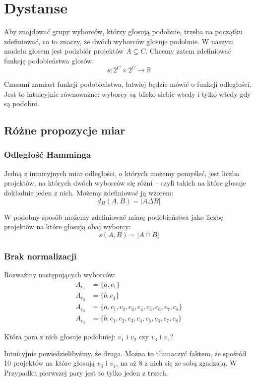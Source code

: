 \documentclass{article}
\begin{document}
\section{Dystanse}

Aby znajdować grupy wyborców, którzy głosują podobnie, trzeba na początku
zdefiniować, co to znaczy, że dwóch wyborców głosuje podobnie. W naszym modelu
głosem jest podzbiór projektów $A \subseteq C$. Chcemy zatem zdefiniować
funkcję podobieństwa głosów:
\[ s : 2^C \times 2^C \to \mathbb{R} \]

Czasami zamiast funkcji podobieństwa, łatwiej będzie mówić o funkcji
odległości. Jest to intuicyjnie równoważne: wyborcy są blisko siebie wtedy i
tylko wtedy gdy są podobni.

\subsection{Różne propozycje miar}

\subsubsection{Odległość Hamminga}

Jedną z intuicyjnych miar odległości, o których możemy pomyśleć, jest liczba
projektów, na których dwóch wyborców się różni -- czyli takich na które głosuje
dokładnie jeden z nich. Możemy zdefiniować ją wzorem:
\[ d_H(A,B) = |A \Delta B| \]

W podobny sposób możemy zdefiniować miarę podobieństwa jako liczbę projektów
na które głosują obaj wyborcy:
\[ s(A,B) = |A \cap B| \]

\subsubsection*{Brak normalizacji}

Rozważmy następujących wyborców:
\begin{align*}
  A_{v_1} &= \{ a, c_1 \} \\
  A_{v_2} &= \{ b, c_1 \} \\
  A_{v_3} &= \{ a, c_1, c_2, c_3, c_4, c_5, c_6, c_7, c_8 \} \\
  A_{v_4} &= \{ b, c_1, c_2, c_3, c_4, c_5, c_6, c_7, c_8 \}
\end{align*}

Która para z nich głosuje podobniej: $v_1$ i $v_2$ czy $v_3$ i $v_4$?

Intuicyjnie powiedzielibyśmy, że druga. Można to tłumaczyć faktem, że spośród
10 projektów na które głosują $v_3$ i $v_4$, na aż 8 z nich się ze sobą
zgadzają. W Przypadku pierwszej pary jest to tylko jeden z trzech.
\end{document}
